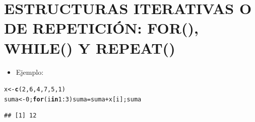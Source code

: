 \documentclass[12pt,letterpaper]{article}\usepackage[]{graphicx}\usepackage[]{color}
\makeatletter
\newcommand{\hlnum}[1]{\textcolor[rgb]{0.686,0.059,0.569}{#1}}%
\newcommand{\hlopt}[1]{\textcolor[rgb]{0,0,0}{#1}}%
\newcommand{\hlstd}[1]{\textcolor[rgb]{0.345,0.345,0.345}{#1}}%
\newcommand{\hlkwa}[1]{\textcolor[rgb]{0.161,0.373,0.58}{\textbf{#1}}}%
\newcommand{\hlkwb}[1]{\textcolor[rgb]{0.69,0.353,0.396}{#1}}%
\newcommand{\hlkwd}[1]{\textcolor[rgb]{0.737,0.353,0.396}{\textbf{#1}}}%
\newenvironment{kframe}{%
 \def\at@end@of@kframe{}%
 \ifinner\ifhmode%
  \def\at@end@of@kframe{\end{minipage}}%
  \begin{minipage}{\columnwidth}%
 \fi\fi%
 \def\FrameCommand##1{\hskip\@totalleftmargin \hskip-\fboxsep
 \colorbox{shadecolor}{##1}\hskip-\fboxsep
     \hskip-\linewidth \hskip-\@totalleftmargin \hskip\columnwidth}%
 \MakeFramed {\advance\hsize-\width
   \@totalleftmargin\z@ \linewidth\hsize
   \@setminipage}}%
 {\par\unskip\endMakeFramed%
 \at@end@of@kframe}
\newenvironment{knitrout}{}{} %
\makeatother
\begin{document}
\section {ESTRUCTURAS ITERATIVAS O DE REPETICI\'ON: FOR(), WHILE() Y REPEAT()}
\begin{itemize}
\item Ejemplo:
\end {itemize}
\begin{knitrout}
\color{fgcolor}\begin{kframe}
\begin{alltt}
\hlstd{x} \hlkwb{<-} \hlkwd{c}\hlstd{(}\hlnum{2}\hlstd{,} \hlnum{6}\hlstd{,} \hlnum{4}\hlstd{,} \hlnum{7}\hlstd{,} \hlnum{5}\hlstd{,} \hlnum{1}\hlstd{)}
\hlstd{suma}\hlkwb{<-}\hlnum{0}\hlstd{;} \hlkwa{for}\hlstd{(i} \hlkwa{in} \hlnum{1}\hlopt{:}\hlnum{3}\hlstd{) suma} \hlkwb{=} \hlstd{suma}\hlopt{+}\hlstd{x[i]; suma}
\end{alltt}
\begin{verbatim}
## [1] 12
\end{verbatim}
\end{kframe}
\end{knitrout}
\end{document}
